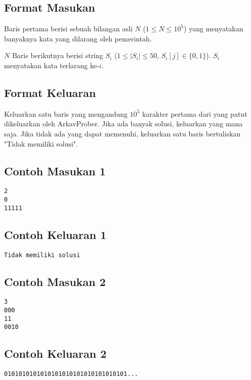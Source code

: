 \documentclass{article}
\begin{document}
\subsection*{Format Masukan}

Baris pertama berisi sebuah bilangan asli $N$ ($1 \leq N \leq 10^5$) yang menyatakan banyaknya kata yang dilarang oleh pemerintah.

$N$ Baris berikutnya berisi string $S_i$ ($1 \leq |S_i| \leq 50$, $S_i[j] \in \{0, 1\}$). $S_i$ menyatakan kata terlarang ke-$i$.

\subsection*{Format Keluaran}

Keluarkan satu baris yang mengandung $10^5$ karakter pertama dari  yang patut dikeluarkan oleh ArkavProber. Jika ada banyak solusi, keluarkan yang mana saja. Jika tidak ada yang dapat memenuhi, keluarkan satu baris bertuliskan "Tidak memiliki solusi".
\\

\begin{multicols}{2}
\subsection*{Contoh Masukan 1}
\begin{lstlisting}
2
0
11111
\end{lstlisting}
\columnbreak
\subsection*{Contoh Keluaran 1}
\begin{lstlisting}
Tidak memiliki solusi
\end{lstlisting}
\vfill
\null
\end{multicols}

\begin{multicols}{2}
\subsection*{Contoh Masukan 2}
\begin{lstlisting}
3
000
11
0010
\end{lstlisting}
\columnbreak
\subsection*{Contoh Keluaran 2}
\begin{lstlisting}
0101010101010101010101010101010101...
\end{lstlisting}
\vfill
\null
\end{multicols}
\end{document}
